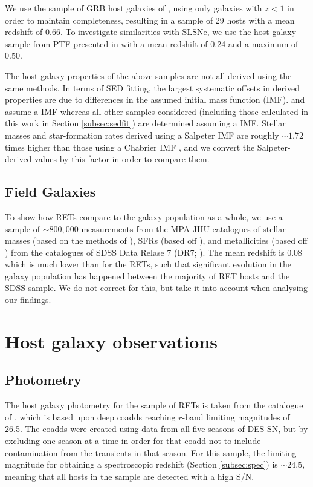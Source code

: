 \documentclass[fleqn,usenatbib,]{mnras}
\begin{document}
We use the sample of GRB host galaxies of \citet{Kruehler2015}, using only galaxies with $z<1$ in order to maintain completeness, resulting in a sample of 29 hosts with a mean redshift of 0.66. To investigate similarities with SLSNe, we use the host galaxy sample from PTF presented in \citet{Perley2016c} with a mean redshift of 0.24 and a maximum of 0.50.

The host galaxy properties of the above samples are not all derived using the same methods. In terms of SED fitting, the largest systematic offsets in derived properties are due to differences in the assumed initial mass function (IMF). \citet{Stoll2013} and \citet{Drout2014} assume a \citet{Salpeter1955} IMF whereas all other samples considered (including those calculated in this work in Section \ref{subsec:sedfit}) are determined assuming a \citet{Chabrier2003} IMF. Stellar masses and star-formation rates derived using a Salpeter IMF are roughly $\sim 1.72$ times higher than those using a Chabrier IMF \citep{Speagle2014}, and we convert the Salpeter-derived values by this factor in order to compare them.

\subsection{Field Galaxies \label{subsubsec:sdss}}

To show how RETs compare to the galaxy population as a whole, we use a sample of $\sim800,000$ measurements from the MPA-JHU catalogues of stellar masses (based on the methods of \citealt{Kauffmann2003,Salim2007}), SFRs (based off \citealt{Brinchmann2004}), and metallicities (based off \citealt{Tremonti2004}) from the  catalogues of SDSS Data Relase 7 (DR7; \citealt{Abazajian2009}). The mean redshift is 0.08 which is much lower than for the RETs, such that significant evolution in the galaxy population has happened between the majority of RET hosts and the SDSS sample. We do not correct for this, but take it into account when analysing our findings. 
\section{Host galaxy observations}
\label{sec:obs}
\subsection{Photometry \label{subsec:phot}}

The host galaxy photometry for the sample of RETs is taken from the catalogue of , which is based upon deep coadds reaching $r$-band limiting magnitudes of 26.5. The coadds were created using data from all five seasons of DES-SN, but by excluding one season at a time in order for that coadd not to include contamination from the transients in that season. For this sample, the limiting magnitude for obtaining a spectroscopic redshift (Section \ref{subsec:spec}) is $\sim 24.5$, meaning that all hosts in the sample are detected with a high S/N.
\end{document}
